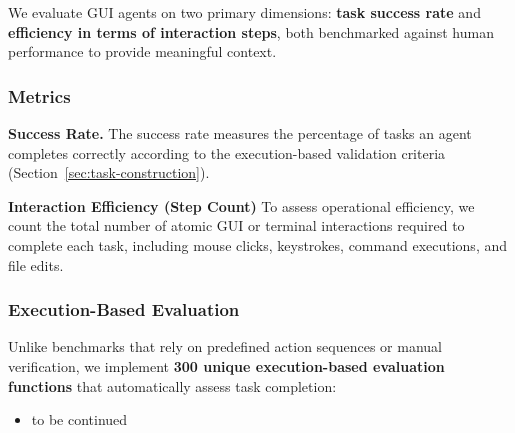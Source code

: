 We evaluate GUI agents on two primary dimensions: \textbf{task success rate} and \textbf{efficiency in terms of interaction steps}, both benchmarked against human performance to provide meaningful context.

\subsubsection{Metrics}

\textbf{Success Rate.} The success rate measures the percentage of tasks an agent completes correctly according to the execution-based validation criteria (Section~\ref{sec:task-construction}). 


\textbf{Interaction Efficiency (Step Count)} To assess operational efficiency, we count the total number of atomic GUI or terminal interactions required to complete each task, including mouse clicks, keystrokes, command executions, and file edits. 


\subsubsection{Execution-Based Evaluation}

Unlike benchmarks that rely on predefined action sequences or manual verification, we implement \textbf{300 unique execution-based evaluation functions} that automatically assess task completion:

\begin{itemize}
\item to be continued
\end{itemize}
